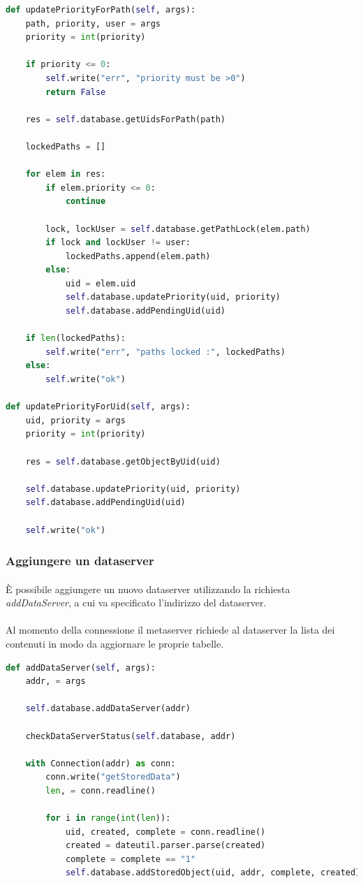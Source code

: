 \documentclass[11pt,a4paper,english]{article}
\begin{document}
\begin{lstlisting}[language=Python, title=Metaserver]
def updatePriorityForPath(self, args):
    path, priority, user = args
    priority = int(priority)

    if priority <= 0:
        self.write("err", "priority must be >0")
        return False

    res = self.database.getUidsForPath(path)

    lockedPaths = []

    for elem in res:
        if elem.priority <= 0:
            continue

        lock, lockUser = self.database.getPathLock(elem.path)
        if lock and lockUser != user:
            lockedPaths.append(elem.path)
        else:
            uid = elem.uid
            self.database.updatePriority(uid, priority)
            self.database.addPendingUid(uid)

    if len(lockedPaths):
        self.write("err", "paths locked :", lockedPaths)
    else:
        self.write("ok")

def updatePriorityForUid(self, args):
    uid, priority = args
    priority = int(priority)

    res = self.database.getObjectByUid(uid)

    self.database.updatePriority(uid, priority)
    self.database.addPendingUid(uid)

    self.write("ok")
\end{lstlisting}

\subsubsection{Aggiungere un dataserver}

\paragraph{} È possibile aggiungere un nuovo dataserver utilizzando la richiesta \emph{addDataServer}, a cui va specificato l'indirizzo del dataserver. 

\paragraph{} Al momento della connessione il metaserver richiede al dataserver la lista dei contenuti in modo da aggiornare le proprie tabelle. 

\begin{lstlisting}[language=Python, title=Metaserver]
def addDataServer(self, args):
    addr, = args

    self.database.addDataServer(addr)

    checkDataServerStatus(self.database, addr)

    with Connection(addr) as conn:
        conn.write("getStoredData")
        len, = conn.readline()

        for i in range(int(len)):
            uid, created, complete = conn.readline()
            created = dateutil.parser.parse(created)
            complete = complete == "1"
            self.database.addStoredObject(uid, addr, complete, created)
\end{lstlisting}
\end{document}
